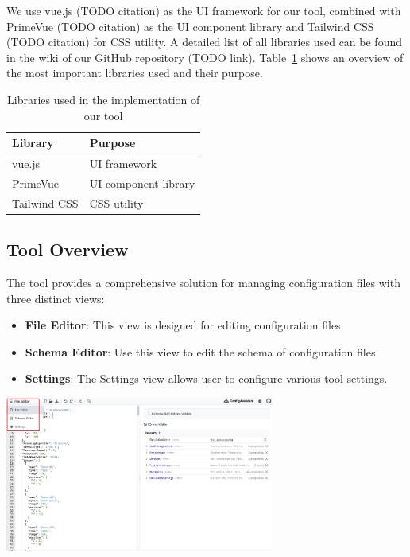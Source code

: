 We use vue.js (TODO citation) as the UI framework for our tool, combined with PrimeVue (TODO citation) as the UI component library and Tailwind CSS (TODO citation) for CSS utility.
A detailed list of all libraries used can be found in the wiki of our GitHub repository (TODO link).
Table~\ref{tab:libraries} shows an overview of the most important libraries used and their purpose.

\begin{table}[!t]
    \caption{Libraries used in the implementation of our tool}
    \label{tab:libraries}
    \centering
    \begin{tabular}{ll}
        \toprule
        \textbf{Library} & \textbf{Purpose}     \\
        \midrule
        vue.js           & UI framework         \\
        PrimeVue         & UI component library \\
        Tailwind CSS     & CSS utility          \\
        \bottomrule
    \end{tabular}
\end{table}

\subsection{Tool Overview}\label{subsec:tool-overview} %


The tool provides a comprehensive solution for managing configuration files with three distinct views:
\begin{itemize}
    \item \textbf{File Editor}: This view is designed for editing configuration files.
    \item \textbf{Schema Editor}: Use this view to edit the schema of configuration files.
    \item \textbf{Settings}: The Settings view allows user to configure various tool settings.
\end{itemize}
\begin{minipage}[t]{0.5\textwidth} %
    \includegraphics[width=3.5in]{figures/Views}
\end{minipage}

